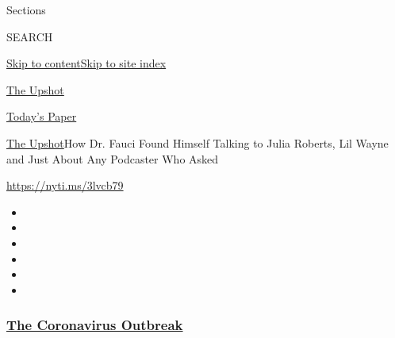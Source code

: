 Sections

SEARCH

\protect\hyperlink{site-content}{Skip to
content}\protect\hyperlink{site-index}{Skip to site index}

\href{https://www.nytimes3xbfgragh.onion/section/upshot}{The Upshot}

\href{https://myaccount.nytimes3xbfgragh.onion/auth/login?response_type=cookie\&client_id=vi}{}

\href{https://www.nytimes3xbfgragh.onion/section/todayspaper}{Today's
Paper}

\href{/section/upshot}{The Upshot}\textbar{}How Dr. Fauci Found Himself
Talking to Julia Roberts, Lil Wayne and Just About Any Podcaster Who
Asked

\url{https://nyti.ms/3lvcb79}

\begin{itemize}
\item
\item
\item
\item
\item
\item
\end{itemize}

\hypertarget{the-coronavirus-outbreak}{%
\subsubsection{\texorpdfstring{\href{https://www.nytimes3xbfgragh.onion/news-event/coronavirus?name=styln-coronavirus-national\&region=TOP_BANNER\&block=storyline_menu_recirc\&action=click\&pgtype=Interactive\&impression_id=caee8ed0-f4d3-11ea-b0c3-9b7cad4a02b8\&variant=undefined}{The
Coronavirus
Outbreak}}{The Coronavirus Outbreak}}\label{the-coronavirus-outbreak}}

